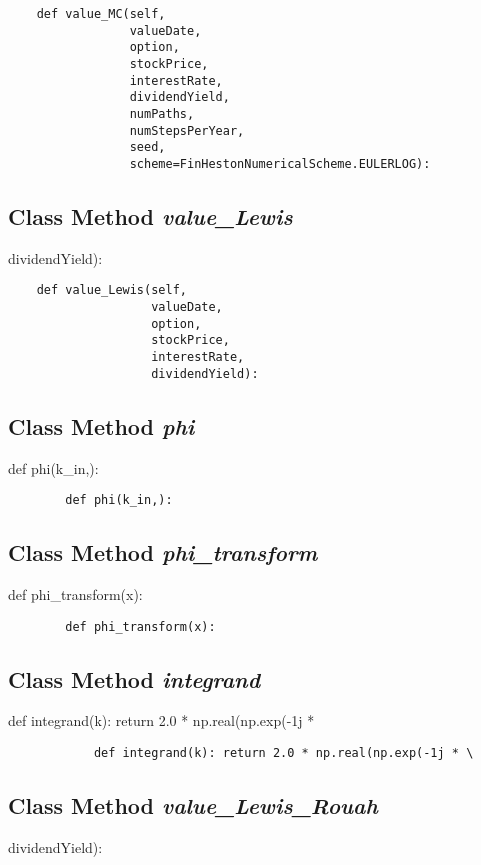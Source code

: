\documentclass[twoside,11pt]{book}
\begin{document}
\begin{lstlisting}
    def value_MC(self,
                 valueDate,
                 option,
                 stockPrice,
                 interestRate,
                 dividendYield,
                 numPaths,
                 numStepsPerYear,
                 seed,
                 scheme=FinHestonNumericalScheme.EULERLOG):
\end{lstlisting}

\subsection{Class Method {\it value\_Lewis}}
dividendYield):

\begin{lstlisting}
    def value_Lewis(self,
                    valueDate,
                    option,
                    stockPrice,
                    interestRate,
                    dividendYield):
\end{lstlisting}

\subsection{Class Method {\it phi}}
def phi(k\_in,):

\begin{lstlisting}
        def phi(k_in,):
\end{lstlisting}

\subsection{Class Method {\it phi\_transform}}
def phi\_transform(x):

\begin{lstlisting}
        def phi_transform(x):
\end{lstlisting}

\subsection{Class Method {\it integrand}}
def integrand(k): return 2.0 * np.real(np.exp(-1j * \

\begin{lstlisting}
            def integrand(k): return 2.0 * np.real(np.exp(-1j * \
\end{lstlisting}

\subsection{Class Method {\it value\_Lewis\_Rouah}}
dividendYield):
\end{document}
